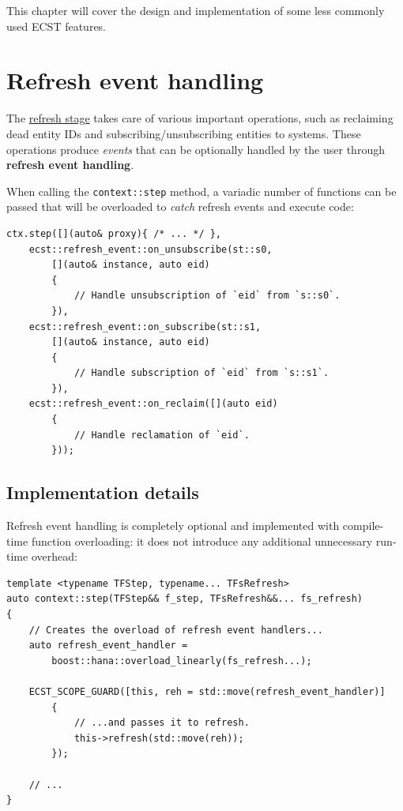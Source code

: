 \documentclass[oneside, 12pt, a4paper, openany]{book}
\begin{document}
This chapter will cover the design and implementation of some less
commonly used ECST features.

\hypertarget{advf_refresh_event_handling}{\section{Refresh event
handling}\label{advf_refresh_event_handling}}

The \protect\hyperlink{flow_refresh}{refresh stage} takes care of
various important operations, such as reclaiming dead entity IDs and
subscribing/unsubscribing entities to systems. These operations produce
\emph{events} that can be optionally handled by the user through
\textbf{refresh event handling}.

When calling the
\texttt{context::step}
method, a variadic number of functions can be passed that will be
overloaded to \emph{catch} refresh events and execute code:

\begin{verbatim}
ctx.step([](auto& proxy){ /* ... */ },
    ecst::refresh_event::on_unsubscribe(st::s0,
        [](auto& instance, auto eid)
        {
            // Handle unsubscription of `eid` from `s::s0`.
        }),
    ecst::refresh_event::on_subscribe(st::s1,
        [](auto& instance, auto eid)
        {
            // Handle subscription of `eid` from `s::s1`.
        }),
    ecst::refresh_event::on_reclaim([](auto eid)
        {
            // Handle reclamation of `eid`.
        }));
\end{verbatim}

\subsection{Implementation details}\label{implementation-details-1}

Refresh event handling is completely optional and implemented with
compile-time function overloading: it does not introduce any additional
unnecessary run-time overhead:

\begin{verbatim}
template <typename TFStep, typename... TFsRefresh>
auto context::step(TFStep&& f_step, TFsRefresh&&... fs_refresh)
{
    // Creates the overload of refresh event handlers...
    auto refresh_event_handler =
        boost::hana::overload_linearly(fs_refresh...);

    ECST_SCOPE_GUARD([this, reh = std::move(refresh_event_handler)]
        {
            // ...and passes it to refresh.
            this->refresh(std::move(reh));
        });

    // ...
}
\end{verbatim}
\end{document}

